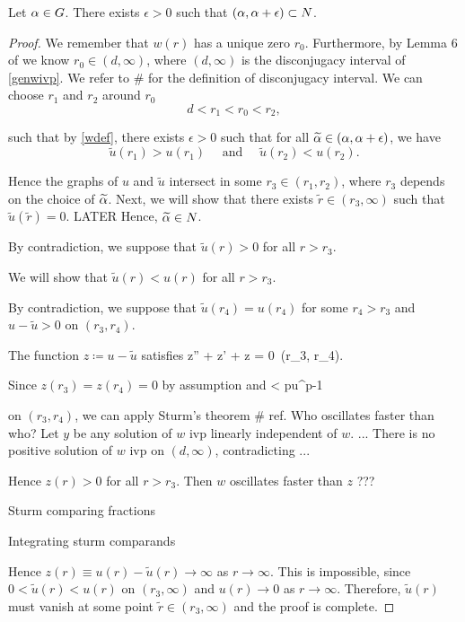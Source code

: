 \begin{lemma}\label{genlem7}
Let $\alpha \in G$. There exists $\epsilon > 0$ such that $(\alpha, \alpha + \epsilon)
\subset N$. 
\end{lemma}
\begin{proof}
We remember that $w(r)$ has a unique zero $r_0$. 
Furthermore, by Lemma 6 of \cite[p.~249]{kwong} we know $r_0 \in (d,
\infty)$, where $(d, \infty)$ is the disconjugacy interval of \eqref{genwivp}.
We refer to \# for the definition of disconjugacy interval. We can choose
$r_1$ and $r_2$ around $r_0$
\[ d < r_1 < r_0 < r_2, \]

such that by \eqref{wdef}, there exists $\epsilon > 0$ 
such that for all $\widetilde{\alpha} \in (\alpha, \alpha + \epsilon)$, we have
\[
\tilde{u}(r_1) > u(r_1)\quad\text{ and }\quad \tilde{u}(r_2) < u(r_2).
\]

Hence the graphs of $u$ and $\tilde{u}$ intersect in some $r_3 \in (r_1, r_2)$,
where $r_3$ depends on the choice of $\widetilde{\alpha}$. Next, we will show that there
exists $\tilde{r} \in (r_3, \infty)$ such that $\tilde{u}(\tilde{r}) = 0$.
{\red LATER Hence, $\widetilde{\alpha} \in N$.}

By contradiction, we suppose that $\tilde{u}(r) > 0$ for all $r > r_3$.

We will show that $\tilde{u}(r) < u(r)$ for all $r > r_3$.

By contradiction, we suppose that $\tilde{u}(r_4) = u(r_4)$ for some $r_4 > r_3$
and $u - \tilde{u} > 0$ on $(r_3, r_4)$.

The function $z \coloneqq u - \tilde{u}$ satisfies
\be \label{zivp}
z'' +  z' +  z = 0\quad{}~(r_3, r_4). 
\ee


Since $z(r_3) = z(r_4) = 0$ by assumption and
\be \label{zcomp} 
 < pu^{p-1} 
\ee

on $(r_3, r_4)$, we can apply Sturm's theorem \# ref. {\red Who oscillates
faster than who?} Let $y$ be any solution of $w$ ivp linearly independent of
$w$. ... There is no positive solution of $w$ ivp on $(d, \infty)$,
contradicting ...

Hence $z(r) > 0$ for all $r > r_3$. Then $w$ oscillates faster than $z$ ???

Sturm comparing fractions

Integrating sturm comparands

Hence $z(r) \equiv u(r) - \tilde{u}(r) \to \infty$ as $r \to \infty$. This is
impossible, since $0 < \tilde{u}(r) < u(r)$ on $(r_3, \infty)$ and $u(r) \to 0$
as $r \to \infty$. Therefore, $\tilde{u}(r)$ must vanish at some point
$\tilde{r} \in (r_3, \infty)$ and the proof is complete.
 
\end{proof}

